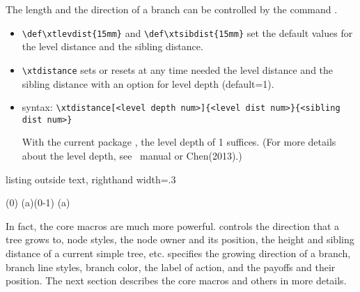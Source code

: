 The length and the direction of a branch can be controlled by the command \cmd{\xtdistance}. 



\begin{itemize}
\item \verb|\def\xtlevdist{15mm}| and \verb|\def\xtsibdist{15mm}| set the default values for the level distance and the sibling distance.
\item \verb|\xtdistance| sets or resets at any time needed the level distance and the sibling distance with an option for level depth (default=1).
\item syntax: \verb|\xtdistance[<level depth num>]{<level dist num>}{<sibling dist num>}|

With the current package , the level depth of 1 suffices.
(For more details about the level depth, see \Tikz\ manual or Chen(2013).)
\end{itemize}


\begin{tcblisting}{listing outside text, righthand width=.3\linewidth}
\begin{istgame}
\xtdistance{15mm}{15mm} %
\istroot(0) %
  \istb %
  \istb %
  \istb %
\endist %
\xtdistance{15mm}{30mm} %
\istroot(a)(0-1) %
  \istb %
  \istb %
\endist
\istroot(a)
\end{istgame}
\end{tcblisting}

In fact, the core macros are much more powerful. \cmd{\istroot} controls the direction that a tree grows to, 
node styles, the node owner and its position, the height and sibling distance of a current simple tree, etc.
\cmd{\istb} specifies the growing direction of a branch, branch line styles, branch color, the label of action, and the payoffs and their position. The next section describes the core macros and others in more details.

